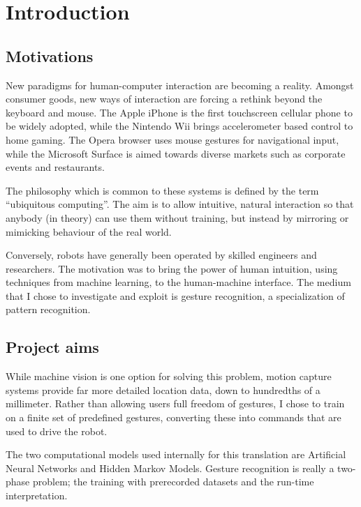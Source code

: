 \documentclass[12pt,a4,notitlepage]{report}
\renewcommand{\_}{\texttt{\symbol{95}}}
\newcommand{\<}{\texttt{\symbol{60}}}
\renewcommand{\>}{\texttt{\symbol{62}}}
\begin{document}
\setcounter{page}{1}
\pagestyle{headings}

\chapter{Introduction}

\section{Motivations}
New paradigms for human-computer interaction are becoming a reality. Amongst consumer goods, new ways of interaction are forcing a rethink beyond the keyboard and mouse. The Apple iPhone is the first touchscreen cellular phone to be widely adopted, while the Nintendo Wii brings accelerometer based control to home gaming. The Opera browser uses mouse gestures for navigational input, while the Microsoft Surface is aimed towards diverse markets such as corporate events and restaurants.

The philosophy which is common to these systems is defined by the term ``ubiquitous computing''. The aim is to allow intuitive, natural interaction so that anybody (in theory) can use them without training, but instead by mirroring or mimicking behaviour of the real world.

Conversely, robots have generally been operated by skilled engineers and researchers. The motivation was to bring the power of human intuition, using techniques from machine learning, to the human-machine interface. The medium that I chose to investigate and exploit is gesture recognition, a specialization of pattern recognition.

\section{Project aims}

While machine vision is one option for solving this problem, motion capture systems provide far more detailed location data, down to hundredths of a millimeter. Rather than allowing users full freedom of gestures, I chose to train on a finite set of predefined gestures, converting these into commands that are used to drive the robot. 

The two computational models used internally for this translation are Artificial Neural Networks and Hidden Markov Models. Gesture recognition is really a two-phase problem; the training with prerecorded datasets and the run-time interpretation. 
\end{document}
